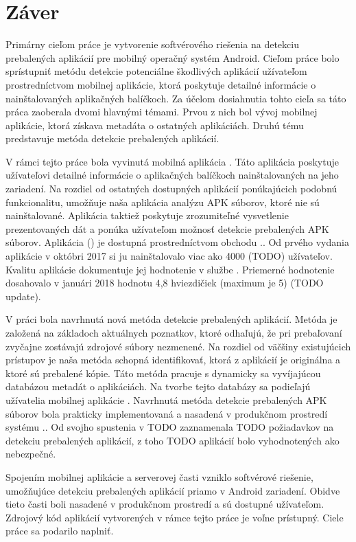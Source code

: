 \chapter{Záver}
Primárny cieľom práce je vytvorenie softvérového riešenia na detekciu prebalených aplikácií pre mobilný operačný systém Android. Cieľom práce bolo sprístupniť metódu detekcie potenciálne škodlivých aplikácií užívateľom prostredníctvom mobilnej aplikácie, ktorá poskytuje detailné informácie o nainštalovaných aplikačných balíčkoch.  
Za účelom dosiahnutia tohto cieľa sa táto práca zaoberala dvomi hlavnými témami. Prvou z nich bol vývoj mobilnej aplikácie, ktorá získava metadáta o ostatných aplikáciách. Druhú tému predstavuje metóda detekcie prebalených aplikácií. 

V rámci tejto práce bola vyvinutá mobilná aplikácia . Táto aplikácia poskytuje užívateľovi detailné informácie o aplikačných balíčkoch nainštalovaných na jeho zariadení. Na rozdiel od ostatných dostupných aplikácií ponúkajúcich podobnú funkcionalitu, umožňuje naša aplikácia analýzu APK súborov, ktoré nie sú nainštalované. Aplikácia taktiež poskytuje zrozumiteľné vysvetlenie prezentovaných dát a ponúka užívateľom možnosť detekcie prebalených APK súborov. Aplikácia  () je dostupná prostredníctvom obchodu .. Od prvého vydania aplikácie v októbri 2017 si ju nainštalovalo viac ako 4000 (TODO) užívateľov. Kvalitu aplikácie dokumentuje jej hodnotenie v službe . Priemerné hodnotenie dosahovalo v januári 2018 hodnotu 4,8 hviezdičiek (maximum je 5) (TODO update).

V práci bola navrhnutá nová metóda detekcie prebalených aplikácií. Metóda je založená na základoch aktuálnych poznatkov, ktoré odhaľujú, že pri prebaľovaní zvyčajne zostávajú zdrojové súbory nezmenené. Na rozdiel od väčšiny existujúcich prístupov je naša metóda schopná identifikovať, ktorá z aplikácií je originálna a ktoré sú prebalené kópie. Táto metóda pracuje s dynamicky sa vyvíjajúcou databázou metadát o aplikáciách. Na tvorbe tejto databázy sa podieľajú užívatelia mobilnej aplikácie . Navrhnutá metóda detekcie prebalených APK súborov bola prakticky implementovaná a nasadená v produkčnom prostredí systému .. Od svojho spustenia v TODO zaznamenala TODO požiadavkov na detekciu prebalených aplikácií, z toho TODO aplikácií bolo vyhodnotených ako nebezpečné.


Spojením mobilnej aplikácie a serverovej časti vzniklo softvérové riešenie, umožňujúce detekciu prebalených aplikácií priamo v Android zariadení. Obidve tieto časti boli nasadené v produkčnom prostredí a sú dostupné užívateľom. Zdrojový kód aplikácií vytvorených v rámce tejto práce je voľne prístupný.  Ciele práce sa podarilo naplniť.
